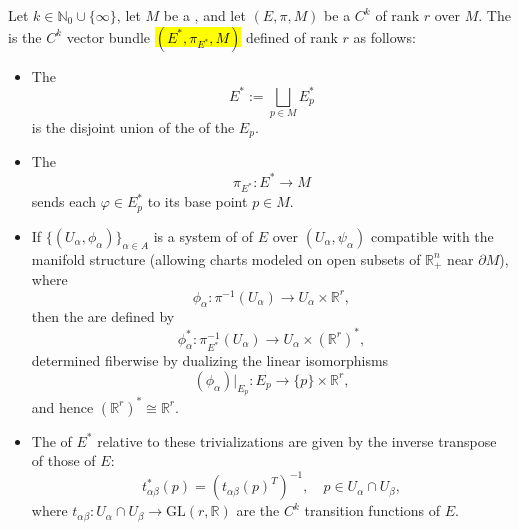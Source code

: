 \begin{definition} \label{definition:dual_bundle_of_a_C_k_vector_bundle}
Let $k \in \mathbb{N}_0 \cup \{\infty\}$, let $M$ be a , and let $(E, \pi, M)$ be a $C^k$  of rank $r$ over $M$.
The  is the $C^k$ vector bundle \hl{$(E^*, \pi_{E^*}, M)$} defined of rank $r$ as follows:
\begin{itemize}
  \item The 
  $$ E^* := \bigsqcup_{p \in M} E_p^* $$
  is the disjoint union of the  of the  $E_p$.
  
  \item The 
  $$ \pi_{E^*} : E^* \to M $$
  sends each $\varphi \in E_p^*$ to its base point $p \in M$.
  
  \item If $\{(U_\alpha, \phi_\alpha)\}_{\alpha \in A}$ is a system of  of $E$ over  $(U_\alpha, \psi_\alpha)$ compatible with the manifold structure (allowing charts modeled on open subsets of $\mathbb{R}^n_+$ near $\partial M$), where
  $$ \phi_\alpha : \pi^{-1}(U_\alpha) \to U_\alpha \times \mathbb{R}^r, $$
  then the  are defined by
  $$
  \phi_\alpha^* : \pi_{E^*}^{-1}(U_\alpha) \to U_\alpha \times (\mathbb{R}^r)^*,
  $$
  determined fiberwise by dualizing the linear isomorphisms
  $$
  (\phi_\alpha)|_{E_p} : E_p \to \{p\} \times \mathbb{R}^r,
  $$
  and hence $(\mathbb{R}^r)^* \cong \mathbb{R}^r$.
  
  \item The  of $E^*$ relative to these trivializations are given by the inverse transpose of those of $E$:
  $$
  t_{\alpha\beta}^*(p) = (t_{\alpha\beta}(p)^T)^{-1}, \quad p \in U_\alpha \cap U_\beta,
  $$
  where $t_{\alpha\beta} : U_\alpha \cap U_\beta \to \mathrm{GL}(r, \mathbb{R})$ are the $C^k$ transition functions of $E$.
\end{itemize}
\end{definition}

